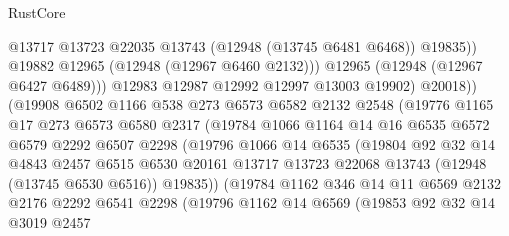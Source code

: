 \begin{lexlean}{RustCore}
\begin{coremodule}
                              @13717
                              @13723
                              @22035
                              @13743
                              (@12948 (@13745 @6481 @6468))
                              @19835))
                          @19882
                          @12965
                          (@12948 (@12967 @6460 @2132)))
                        @12965
                        (@12948 (@12967 @6427 @6489)))
                      @12983
                      @12987
                      @12992
                      @12997
                      @13003
                      @19902)
                    @20018))
                (@19908
                  @6502
                  @1166
                  @538
                  @273
                  @6573
                  @6582
                  @2132
                  @2548
                  (@19776
                    @1165
                    @17
                    @273
                    @6573
                    @6580
                    @2317
                    (@19784
                      @1066
                      @1164
                      @14
                      @16
                      @6535
                      @6572
                      @6579
                      @2292
                      @6507
                      @2298
                      (@19796
                        @1066
                        @14
                        @6535
                        (@19804
                          @92
                          @32
                          @14
                          @4843
                          @2457
                          @6515
                          @6530
                          @20161
                          @13717
                          @13723
                          @22068
                          @13743
                          (@12948 (@13745 @6530 @6516))
                          @19835))
                      (@19784
                        @1162
                        @346
                        @14
                        @11
                        @6569
                        @2132
                        @2176
                        @2292
                        @6541
                        @2298
                        (@19796
                          @1162
                          @14
                          @6569
                          (@19853
                            @92
                            @32
                            @14
                            @3019
                            @2457

\end{coremodule}
\end{lexlean}
